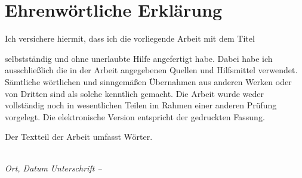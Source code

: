 \newpage
{}
\section*{Ehrenwörtliche Erklärung}

Ich versichere hiermit, dass ich die vorliegende Arbeit mit dem Titel

\begin{center}
    \normalsize\textit{\projecttitle} 
\end{center}

selbstständig und ohne unerlaubte Hilfe angefertigt habe. Dabei habe ich ausschließlich die in der Arbeit angegebenen Quellen und Hilfsmittel verwendet. Sämtliche wörtlichen und sinngemäßen Übernahmen aus anderen Werken oder von Dritten sind als solche kenntlich gemacht. Die Arbeit wurde weder vollständig noch in wesentlichen Teilen im Rahmen einer anderen Prüfung vorgelegt. Die elektronische Version entspricht der gedruckten Fassung.

\vspace{0.5cm}

Der Textteil der Arbeit umfasst \wordcount{} Wörter.

\vspace{2.5cm}

\noindent
\makebox[6cm]{\hrulefill} \hfill \makebox[6cm]{\hrulefill} \\
\noindent
\textit{Ort, Datum} \hfill \textit{Unterschrift – \studentname}